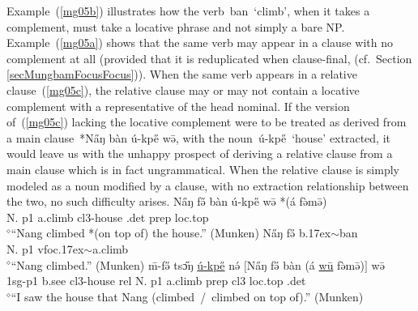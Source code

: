 \documentclass[10pt,twoside]{article}
\makeatletter
\def\ci#1{{\ipaFont #1}}
\newcommand{\gl}[1]{`#1'}
\newcommand{\cl}[1]{{\sc cl#1}}
\newcommand{\sref}[1]{Section \ref{#1}}
\def\elicited{$^\diamond$}
\def\til{\raise.17ex\hbox{$\scriptstyle\mathtt{\sim}$}}	%
\def\ML#1{#1\symbol{"1DC6}} %
\newcommand\Lbi{\ipabar{\ipaclap{\i}{\rotatebox{0}{\emph{\raisebox{.06em}{\`{}}}}}}{.5ex}{1.1}{}{}}
\renewcommand{\i}{ı}
\def\@{ə}
\def\aw{ɔ}
\def\ng{ŋ}
\makeatother
\begin{document}
Example~(\ref{mg05b})
illustrates how the verb~\ci{ban}~\gl{climb}, when it takes a complement, 
must take a locative phrase and not simply a bare NP. Example~(\ref{mg05a})
shows that the same verb may appear in a clause with no complement at all (provided
that it is reduplicated when clause-final, (cf.~\sref{secMungbamFocusFocus})).
%
When the same verb appears in a relative clause~(\ref{mg05c}), the relative clause may
or may not contain a locative complement with a representative of the
head nominal. If the version of~(\ref{mg05c}) lacking the locative complement
were to be treated as derived from a main clause~*\ci{N\H{a}{\ng} b\`an \'u-kp\H{e} w\={\@}}, with
the noun~\ci{\'u-kp\H{e}}~\gl{house} extracted, it would leave us with
the unhappy prospect of deriving a relative clause from a main clause which
is in fact ungrammatical. When the relative clause is simply modeled as
a noun modified by a clause, with no extraction relationship between the two,
no such difficulty arises.
%
\ea	\gll N\H{a}{\ng} f\H{\@} b\`an \'u-kp\H{e} w\={\@} *(\'a f\`{\@}m\={\@})	\\
N. {\sc p1} a.climb \cl3-house {\sc \cl3.det} {\sc  prep} {\sc loc.top}		\\
\glt \elicited``Nang climbed *(on top of) the house.'' (Munken)	\label{mg05b}
\z
\ea	\gll N\H{a}{\ng} f\H{\@} b\Lbi{m}\til{b\ML{a}n}	\\
N. {\sc p1} {\sc vfoc}\til{a.climb}	\\
\glt \elicited``Nang climbed.'' (Munken)	\label{mg05a}
\z
\ea	\gll \=m-f\H{\@} ts\H{\aw}{\ng} \uline{\'u-kp\H{e}} n\'{\@} $[$N\H{a}{\ng} f\H{\@} b\`an (\'a \uline{w\=u} f\`{\@}m\={\@})$]$ w\={\@}	\\ %
1sg-{\sc p1} b.see \cl3-house {\sc rel} N. {\sc p1} a.climb {\sc prep} \cl3 {\sc loc.top} {\sc \cl3.det}	\\
\glt \elicited``I saw the house that Nang (climbed~/~climbed on top of).'' (Munken)	\label{mg05c}
\z
\end{document}
